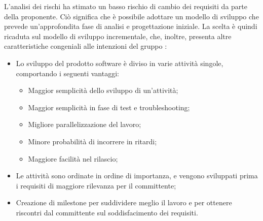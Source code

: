 L'analisi dei rischi ha stimato un basso rischio di cambio dei requisiti da parte della proponente.
Ciò significa che è possibile adottare un modello di sviluppo che prevede un'approfondita fase di 
analisi e progettazione iniziale.
La scelta è quindi ricaduta sul modello di sviluppo incrementale, che, inoltre, presenta altre
caratteristiche congeniali alle intenzioni del gruppo \gruppo \space :
\begin{itemize}
    \item Lo sviluppo del prodotto software è diviso in varie attività singole, comportando i seguenti vantaggi:
    \begin{itemize}
    	\item Maggior semplicità dello sviluppo di un'attività;
    	\item Maggior semplicità in fase di test e troubleshooting;
    	\item Migliore parallelizzazione del lavoro;
    	\item Minore probabilità di incorrere in ritardi;
    	\item Maggiore facilità nel rilascio;
    \end{itemize}
    \item Le attività sono ordinate in ordine di importanza, e vengono sviluppati prima i requisiti di maggiore rilevanza per il committente;
    \item Creazione di {milestone} per suddividere meglio il lavoro e per ottenere riscontri dal committente sul soddisfacimento dei requisiti.
\end{itemize}